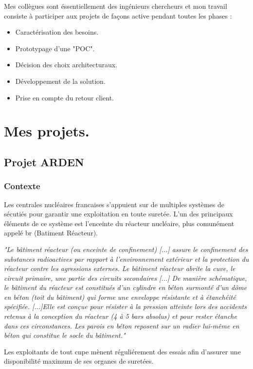Mes collègues sont éssentiellement des ingénieurs chercheurs et mon travail consiste à participer aux projets de façons active pendant toutes les phases : 
\begin{itemize}
\item Caractérisation des besoins.
\item Prototypage d'une "\gls{POC}".
\item Décision des choix architecturaux.
\item Développement de la solution.
\item Prise en compte du retour client.
\end{itemize}

\chapter{Mes projets.}
\section{Projet ARDEN}
\subsection{Contexte}
Les centrales nucléaires francaises s'appuient sur de multiples systèmes de sécutiés pour garantir une exploitation en toute suretée. L'un des principaux éléments de ce système est l'enceinte du réacteur nucléaire, plus comunément appelé \acrshort{br} (Batiment Réacteur).

\textit{"Le bâtiment réacteur (ou enceinte de confinement) [...] assure le confinement des substances radioactives par rapport à l’environnement extérieur et la protection du réacteur contre les agressions externes. 
Le bâtiment réacteur abrite la cuve, le circuit primaire, une partie des circuits secondaires [...]
De manière schématique, le bâtiment du réacteur est constitués d’un cylindre en béton surmonté d’un dôme en béton (toit du bâtiment) qui forme une enveloppe résistante et à étanchéité spécifiée.
[...]Elle est conçue pour résister à la pression atteinte lors des accidents retenus à la conception du réacteur (4 à 5 bars absolus) et pour rester étanche dans ces circonstances. Les parois en béton reposent sur un radier lui-même en béton qui constitue le socle du bâtiment."} \cite[IRSN]{IRSN_suretee}

Les exploitants de tout \acrshort{cnpe} mènent réguliérement des essais afin d'assurer une disponibilité maximum de ses organes de suretées. 

